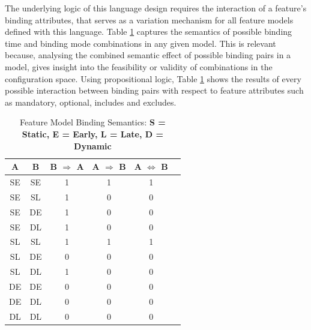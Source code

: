 \documentclass[conference]{IEEEtran}
\begin{document}
The underlying logic of this language design requires the interaction of a feature's binding attributes, that serves as a variation mechanism for all feature models defined with this language. Table \ref{tab:timoconf} captures the semantics of possible binding time and binding mode combinations in any given model. This is relevant because, analysing the combined semantic effect of possible binding pairs in a model, gives insight into the feasibility or validity of combinations in the configuration space. Using propositional logic, Table \ref{tab:timoconf} shows the results of every possible interaction between binding pairs with respect to feature attributes such as mandatory, optional, includes and excludes. 

\begin{table}[H]
\caption{Feature Model Binding Semantics: \textbf{S = Static, E = Early, L = Late, D = Dynamic}}
\begin{center}
\begin{tabular}{c c c c c c}
\hline
    A & B & B $ \Rightarrow $ A & A $ \Rightarrow $ B & A $ \Leftrightarrow $ B \\\hline
         SE & SE & 1 & 1 & 1  \\ \hline
         SE & SL & 1 & 0 & 0  \\ \hline
         SE & DE & 1 & 0 & 0 \\ \hline
         SE & DL & 1 & 0 & 0 \\ \hline
          
         SL & SL & 1 & 1 & 1 \\ \hline
         SL & DE & 0 & 0 & 0 \\ \hline
         SL & DL & 1 & 0 & 0 \\ \hline
         
         DE & DE & 0 & 0 & 0 \\ \hline
         DE & DL & 0 & 0 & 0 \\ \hline
         
         DL & DL & 0 & 0 & 0 \\ \hline
         
\end{tabular}
\label{tab:timoconf}
\end{center}
\end{table}
\end{document}
